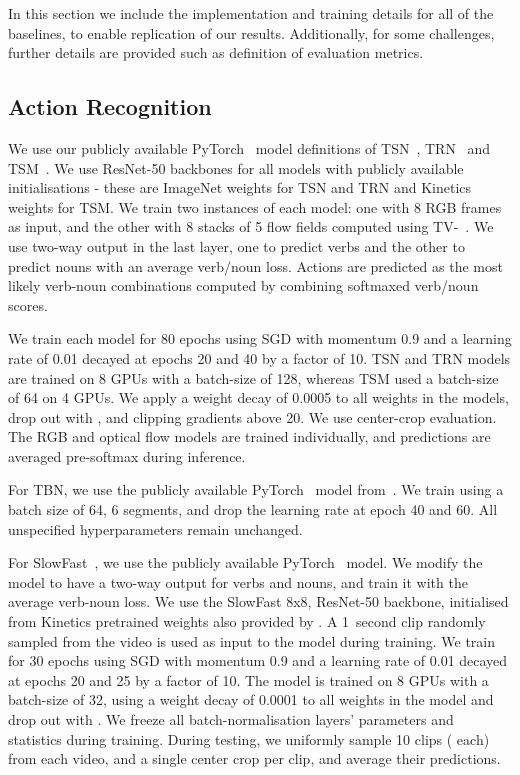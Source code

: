 \RequirePackage{amsmath} \documentclass[runningheads]{llncs}
\newcommand{\chParagraph}[1]{\noindent {\textbf{#1.}} \hspace{6pt}}
\begin{document}
In this section we include the implementation and training details for all of the baselines, to enable replication of our results. Additionally, for some challenges, further details are provided such as definition of evaluation metrics.

\subsection{Action Recognition}
\label{subsec:challenge_action_recog_supp}

\chParagraph{Implementation and Training Details} 
We use our publicly available PyTorch~\cite{pytorch} model definitions of TSN~\cite{wang2016tsn}, TRN~\cite{zhou2017trn} and TSM~\cite{lin2019tsm}. 
We use ResNet-50 backbones for all models with publicly available initialisations - these are ImageNet weights for TSN and TRN and Kinetics weights for TSM.
We train two instances of each model: one with 8 RGB frames as input, and the other with 8 stacks of 5  flow fields computed using TV-~\cite{zach2007duality}.
We use two-way output in the last layer, one to predict verbs and the other to predict nouns with an average verb/noun loss.
Actions are predicted as the most likely verb-noun combinations computed by combining softmaxed verb/noun scores.

We train each model for 80 epochs using SGD with momentum 0.9 and a learning rate of 0.01 decayed at epochs 20 and 40 by a factor of 10.
TSN and TRN models are trained on 8 GPUs with a batch-size of 128, whereas TSM used a batch-size of 64 on 4 GPUs.
We apply a weight decay of 0.0005 to all weights in the models, drop out with , and clipping gradients above 20.
We use center-crop evaluation.
The RGB and optical flow models are trained individually, and predictions are averaged pre-softmax during inference.


For TBN, we use the publicly available PyTorch~\cite{pytorch} model from~\cite{kazakos2019epic}. We train using a batch size of 64, 6 segments, and drop the learning rate at epoch 40 and 60. All unspecified hyperparameters remain unchanged. 

For SlowFast~\cite{feichtenhofer2019slowfast}, we use the publicly available PyTorch~\cite{pytorch} model. We modify the model to have a two-way output for verbs and nouns, and train it with the average verb-noun loss. We use the SlowFast 8x8, ResNet-50 backbone, initialised from Kinetics pretrained weights also provided by \cite{feichtenhofer2019slowfast}. A 1~second clip randomly sampled from the video is used as input to the model during training. We train for 30 epochs using SGD with momentum 0.9 and a learning rate of 0.01 decayed at epochs 20 and 25 by a factor of 10. 
The model is trained on 8 GPUs with a batch-size of 32, using a weight decay of 0.0001 to all weights in the model and drop out with . We freeze all batch-normalisation layers' parameters and statistics during training. During testing, we uniformly sample 10 clips ( each) from each video, and a single center crop per clip, and average their predictions. 
\end{document}
